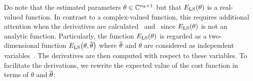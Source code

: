 Do note that the estimated parameters $\theta \in {\ensuremath{\mathbb{C}}}^{n_{\theta} \times 1}$ but that ${E}_{\mathrm{LS}}\!\left( \theta \right)$ is a real-valued function.
In contrast to a complex-valued function, this requires additional attention when the derivatives are calculated~\citep{Messerschmitt2006} and~\citep[Section 15.9]{Pintelon2012} since ${E}_{\mathrm{LS}}\!\left( \theta \right)$ is not an analytic function.
Particularly, the function ${E}_{\mathrm{LS}}\!\left( \theta \right)$ is regarded as a two-dimensional function ${E}_{\mathrm{LS}}\!\left( \theta,\overline{\theta} \right)$ where $\overline{\theta}$ and $\theta$ are considered as independent variables~\citep{Hjorungnes2007,Hjorungnes2011}.
The derivatives are then computed with respect to these variables.
To facilitate the derivations, we rewrite the expected value of the cost function in terms of $\theta$ and $\overline{\theta}$:
